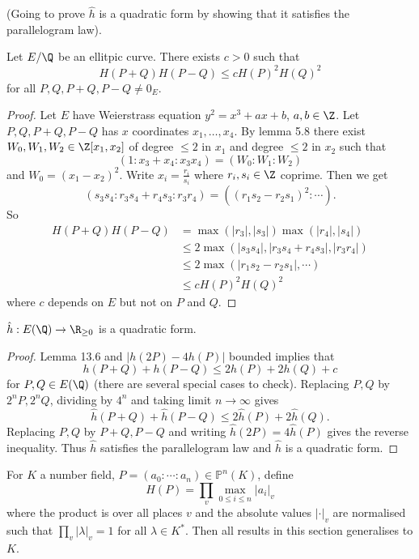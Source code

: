 \documentclass[a4paper]{article}
\theoremstyle{definition}
\renewcommand*{\P}{\mathbb{P}}
\begin{document}
(Going to prove \(\hat h\) is a quadratic form by showing that it satisfies the parallelogram law).

\begin{lemma}
  Let \(E/\Q\) be an ellitpic curve. There exists \(c > 0\) such that
  \[
    H(P + Q) H(P - Q) \leq c H(P)^2 H(Q)^2
  \]
  for all \(P, Q, P + Q, P - Q \ne 0_E\).
\end{lemma}

\begin{proof}
  Let \(E\) have Weierstrass equation \(y^2 = x^3 + ax + b\), \(a, b \in \Z\). Let \(P, Q, P + Q, P - Q\) has \(x\) coordinates \(x_1, \dots, x_4\). By lemma 5.8 there exist \(W_0, W_1, W_2 \in \Z[x_1, x_2]\) of degree \(\leq 2\) in \(x_1\) and degree \(\leq 2\) in \(x_2\) such that
  \[
    (1: x_3 + x_4: x_3x_4) = (W_0: W_1: W_2)
  \]
  and
  \(W_0 = (x_1 - x_2)^2\). Write \(x_i = \frac{r_i}{s_i}\) where \(r_i, s_i \in \Z\) coprime. Then we get
  \[
    (s_3s_4: r_3s_4 + r_4s_3: r_3r_4) = ((r_1s_2 - r_2s_1)^2: \cdots ).
  \]
  So
  \begin{align*}
    H(P + Q) H(P - Q)
    &= \max(|r_3|, |s_3|) \max(|r_4|, |s_4|) \\
    &\leq 2 \max(|s_3s_4|, |r_3s_4 + r_4s_3|, |r_3r_4|) \\
    &\leq 2 \max(|r_1s_2 - r_2s_1|, \cdots) \\
    &\leq c H(P)^2 H(Q)^2
  \end{align*}
  where \(c\) depends on \(E\) but not on \(P\) and \(Q\).
\end{proof}

\begin{theorem}
  \(\hat h: E(\Q) \to \R_{\geq 0}\) is a quadratic form.
\end{theorem}

\begin{proof}
  Lemma 13.6 and \(|h(2P) - 4h(P)|\) bounded implies that
  \[
    h(P + Q) + h(P - Q) \leq 2 h(P) + 2h(Q) + c
  \]
  for \(P, Q \in E(\Q)\) (there are several special cases to check). Replacing \(P, Q\) by \(2^n P, 2^n Q\), dividing by \(4^n\) and taking limit \(n \to \infty\) gives
  \[
    \hat h(P + Q) + \hat h(P - Q) \leq 2 \hat h(P) + 2 \hat h(Q).
  \]
  Replacing \(P, Q\) by \(P + Q, P - Q\) and writing \(\hat h(2P) = 4 \hat h(P)\) gives the reverse inequality. Thus \(\hat h\) satisfies the parallelogram law and \(\hat h\) is a quadratic form.
\end{proof}

\begin{remark}
  For \(K\) a number field, \(P = (a_0: \cdots :a_n) \in \P^n(K)\), define
  \[
    H(P) = \prod_v \max_{0 \leq i \leq n} |a_i|_v
  \]
  where the product is over all places \(v\) and the absolute values \(|\cdot|_v\) are normalised such that \(\prod_v |\lambda|_v = 1\) for all \(\lambda \in K^*\). Then all results in this section generalises to \(K\).
\end{remark}
\end{document}
